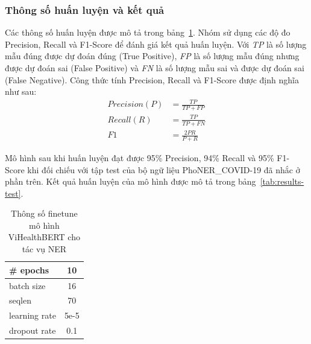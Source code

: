 \documentclass[12pt]{article}
\begin{document}
\subsubsection{Thông số huấn luyện và kết quả}
Các thông số huấn luyện được mô tả trong bảng~\ref{tab:configurations}. Nhóm sử dụng các độ đo Precision, Recall và F1-Score để đánh giá kết quả huấn luyện. Với \textit{TP} là số lượng mẫu đúng được dự đoán đúng (True Positive), \textit{FP} là số lượng mẫu đúng nhưng được dự đoán sai (False Positive) và \textit{FN} là số lượng mẫu sai và được dự đoán sai (False Negative). Công thức tính Precision, Recall và F1-Score được định nghĩa như sau:
\begin{equation*}
\begin{aligned}
Precision (P) &= \frac{TP}{TP + FP} \\
Recall (R) &= \frac{TP}{TP + FN} \\
F1 &= \frac{2PR}{P + R}
\end{aligned}
\end{equation*}

Mô hình sau khi huấn luyện đạt được 95\% Precision, 94\% Recall và 95\% F1-Score khi đối chiếu với tập test của bộ ngữ liệu PhoNER\_COVID-19 đã nhắc ở phần trên. Kết quả huấn luyện của mô hình được mô tả trong bảng~\ref{tab:results-test}.
\begin{table}
\centering
\begin{tabular}{|l|c|}
\hline
\# epochs & 10 \\
\hline
batch size & 16 \\
\hline
seqlen & 70 \\
\hline
learning rate & 5e-5 \\
\hline
dropout rate & 0.1 \\
\hline
\end{tabular}
\caption{Thông số finetune mô hình ViHealthBERT cho tác vụ NER}
\label{tab:configurations}
\end{table}
\end{document}
